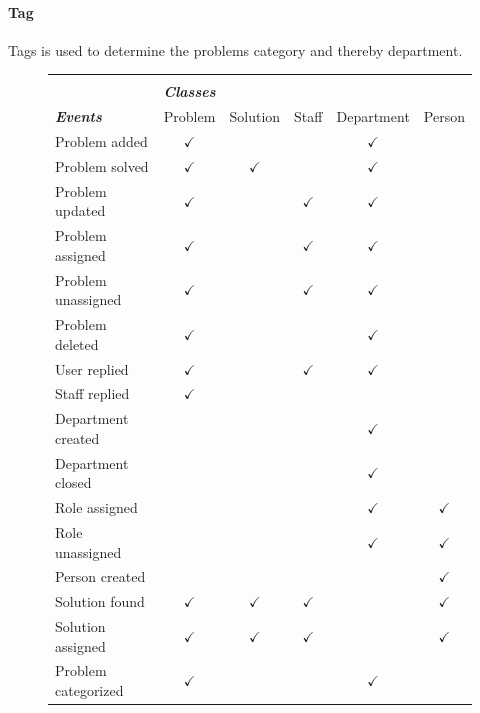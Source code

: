 \paragraph{Tag} Tags is used to determine the problems category and thereby department. 




\begin{figure}[]
\begin{tabular}{ l c c c c c} \hline
\\
&\emph{\textbf{Classes}} &  &  & &  \\ 
\emph{\textbf{Events}} & Problem & Solution & Staff & Department & Person \\ \hline
 Problem added 				& $ \checkmark $ &  &  & $ \checkmark $ &  \\ 
 Problem solved 			& $ \checkmark $ & $ \checkmark $ &  & $ \checkmark $ &  \\ 
 Problem updated 			& $ \checkmark $ &  & $ \checkmark $ & $ \checkmark $ &  \\ 
 Problem assigned 		& $ \checkmark $ &  & $ \checkmark $ & $ \checkmark $ &  \\ 
 Problem unassigned 	& $ \checkmark $ &  & $ \checkmark $ & $ \checkmark $ &  \\ 
 Problem deleted 			& $ \checkmark $ &  &  & $ \checkmark $ &  \\ 
 User replied 				& $ \checkmark $ &  & $ \checkmark $ & $ \checkmark $ &  \\ 
 Staff replied 				& $ \checkmark $ &  &  &  &  \\ 
 Department created 	&  &  &  & $ \checkmark $ &  \\ 
 Department closed 		&  &  &  & $ \checkmark $ &  \\ 
 Role assigned 				&  &  &  & $ \checkmark $ & $ \checkmark $  \\ 
 Role unassigned 			&  &  &  &  $ \checkmark $  & $ \checkmark $ \\ 
 Person created 			&  &  &  &  & $ \checkmark $ \\ 
 Solution found 			& $ \checkmark $ & $ \checkmark $ & $ \checkmark $ &  & $ \checkmark $ \\ 
 Solution assigned		& $ \checkmark $ & $ \checkmark $ & $ \checkmark $ &  & $ \checkmark $ \\ 
 Problem categorized	& $ \checkmark $ &  &  & $ \checkmark $ &  \\ \hline
\end{tabular}
\label{fig:classeseventstable}
\end{figure}